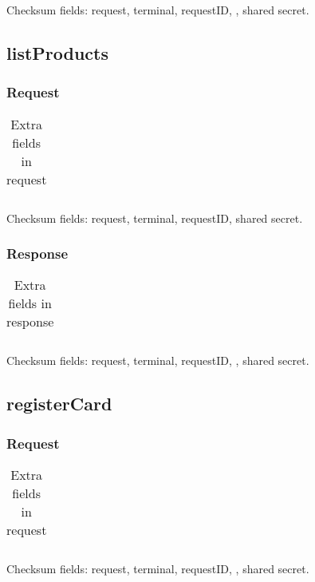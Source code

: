 \documentclass[a4paper,11pt]{article}
\newcommand{\code}[1]
   {\textsf{#1}}
\begin{document}
Checksum fields: request, terminal, requestID, , shared secret.


\subsection{listProducts}

\subsubsection{Request}
\begin{table}[!h]
  \begin{tabular}{|l|l|}
    \hline
       \\\hline
  \end{tabular} 
  \caption{Extra fields in \code{} request}
\end{table}

Checksum fields: request, terminal, requestID, shared secret.

\subsubsection{Response}
\begin{table}[!h]
  \begin{tabular}{|l|l|}
    \hline
       \\\hline
  \end{tabular} 
  \caption{Extra fields in \code{} response}
\end{table}

Checksum fields: request, terminal, requestID, , shared secret.


\subsection{registerCard}

\subsubsection{Request}
\begin{table}[!h]
  \begin{tabular}{|l|l|}
    \hline
       \\\hline
  \end{tabular} 
  \caption{Extra fields in \code{} request}
\end{table}

Checksum fields: request, terminal, requestID, , shared secret.
\end{document}
